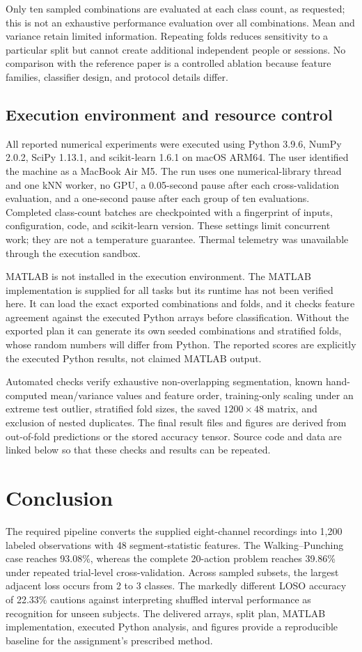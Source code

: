 \documentclass[journal]{IEEEtran}
\begin{document}
Only ten sampled combinations are evaluated at each class count, as requested; this is not an exhaustive performance evaluation over all combinations. Mean and variance retain limited information. Repeating folds reduces sensitivity to a particular split but cannot create additional independent people or sessions. No comparison with the reference paper is a controlled ablation because feature families, classifier design, and protocol details differ.

\subsection{Execution environment and resource control}
All reported numerical experiments were executed using Python 3.9.6, NumPy 2.0.2, SciPy 1.13.1, and scikit-learn 1.6.1 on macOS ARM64. The user identified the machine as a MacBook Air M5. The run uses one numerical-library thread and one kNN worker, no GPU, a 0.05-second pause after each cross-validation evaluation, and a one-second pause after each group of ten evaluations. Completed class-count batches are checkpointed with a fingerprint of inputs, configuration, code, and scikit-learn version. These settings limit concurrent work; they are not a temperature guarantee. Thermal telemetry was unavailable through the execution sandbox.

MATLAB is not installed in the execution environment. The MATLAB implementation is supplied for all tasks but its runtime has not been verified here. It can load the exact exported combinations and folds, and it checks feature agreement against the executed Python arrays before classification. Without the exported plan it can generate its own seeded combinations and stratified folds, whose random numbers will differ from Python. The reported scores are explicitly the executed Python results, not claimed MATLAB output.

Automated checks verify exhaustive non-overlapping segmentation, known hand-computed mean/variance values and feature order, training-only scaling under an extreme test outlier, stratified fold sizes, the saved $1200\times48$ matrix, and exclusion of nested duplicates. The final result files and figures are derived from out-of-fold predictions or the stored accuracy tensor. Source code and data are linked below so that these checks and results can be repeated.

\section{Conclusion}
The required pipeline converts the supplied eight-channel recordings into 1,200 labeled observations with 48 segment-statistic features. The Walking--Punching case reaches 93.08\%, whereas the complete 20-action problem reaches 39.86\% under repeated trial-level cross-validation. Across sampled subsets, the largest adjacent loss occurs from 2 to 3 classes. The markedly different LOSO accuracy of 22.33\% cautions against interpreting shuffled interval performance as recognition for unseen subjects. The delivered arrays, split plan, MATLAB implementation, executed Python analysis, and figures provide a reproducible baseline for the assignment's prescribed method.
\end{document}
